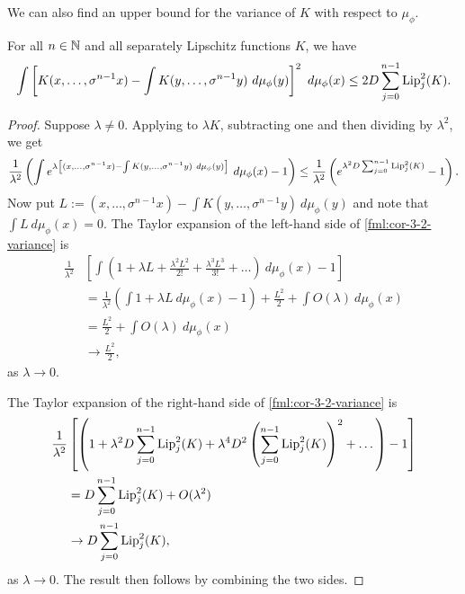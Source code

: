 We can also find an upper bound for the variance of $K$ with respect to $\mu_\phi$.

\begin{corollary} \label{cor:cm-3-2}
	For all $n \in \mathbb{N}$ and all separately Lipschitz functions $K$, we have
	\[
		\int{\left[K(x, \dots, \sigma^{n - 1}{x}) - \int{K(y, \dots, \sigma^{n - 1}{y})\ d\mu_\phi(y)}\right]^2\ d\mu_\phi(x)} \leq 2D\sum_{j = 0}^{n - 1}{\Lip_j^2(K)}.
	\]
	
	\begin{proof}
		Suppose $\lambda \neq 0$. Applying  to $\lambda K$, subtracting one and then dividing by $\lambda^2$, we get
		\begin{equation} \label{fml:cor-3-2-variance}
			\frac{1}{\lambda^2}\left(\int{e^{\lambda\left[(x, \dots, \sigma^{n - 1}{x}) - \int{K(y, \dots, \sigma^{n - 1}{y})\ d\mu_\phi(y)}\right]}\ d\mu_\phi(x)} - 1\right) \leq \frac{1}{\lambda^2}\left(e^{\lambda^2 D \sum_{j = 0}^{n - 1}{\Lip_j^2(K)}} - 1\right).
		\end{equation}
		Now put $L := (x, \dots, \sigma^{n - 1}{x}) - \int{K(y, \dots, \sigma^{n - 1}{y})\ d\mu_\phi(y)}$ and note that $\int{L\ d\mu_\phi(x)} = 0$. The Taylor expansion of the left-hand side of \eqref{fml:cor-3-2-variance} is
		\begin{align*}
			\frac{1}{\lambda^2}&\left[\int{\left(1 + \lambda L + \frac{\lambda^2 L^2}{2!} + \frac{\lambda^3 L^3}{3!} + \dots\right)\ d\mu_\phi(x)} - 1\right] \\
				&= \frac{1}{\lambda^2}\left(\int{1 + \lambda L\ d\mu_\phi(x)} - 1\right) + \frac{L^2}{2} + \int{O(\lambda)\ d\mu_\phi(x)} \\
				&= \frac{L^2}{2} + \int{O(\lambda)\ d\mu_\phi(x)} \\
				&\to \frac{L^2}{2},
		\end{align*}
		as $\lambda \to 0$.
		
		The Taylor expansion of the right-hand side of \eqref{fml:cor-3-2-variance} is
		\begin{align*}
			\frac{1}{\lambda^2}&\left[\left(1 + \lambda^2 D \sum_{j = 0}^{n - 1}{\operatorname{Lip}_j^2(K)} + \lambda^4 D^2 \left(\sum_{j = 0}^{n - 1}{\operatorname{Lip}_j^2(K)} \right)^2 + \dots\right) - 1 \right] \\
				&= D \sum_{j = 0}^{n - 1}{\operatorname{Lip}_j^2(K)} + O(\lambda^2) \\
				&\to D \sum_{j = 0}^{n - 1}{\operatorname{Lip}_j^2(K)},
		\end{align*}
		as $\lambda \to 0$. The result then follows by combining the two sides.
	\end{proof}
\end{corollary}

